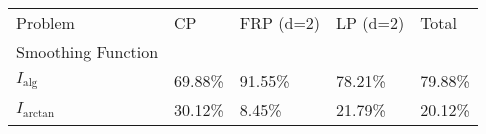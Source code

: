 \begin{tabular}{lllll}
Problem & CP & FRP (d=2) & LP (d=2) & Total \\
Smoothing Function &  &  &  &  \\
$I_\text{alg}$ & 69.88\% & 91.55\% & 78.21\% & 79.88\% \\
\cline{1-5}
$I_\text{arctan}$ & 30.12\% & 8.45\% & 21.79\% & 20.12\% \\
\cline{1-5}
\end{tabular}
